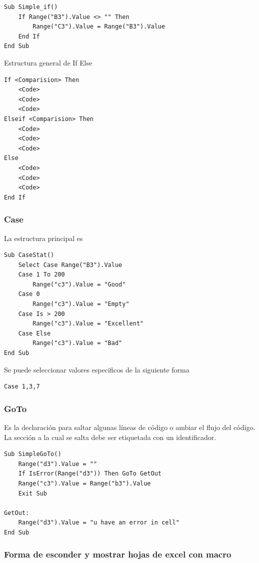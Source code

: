 \begin{verbatim}
Sub Simple_if()
    If Range("B3").Value <> "" Then 
        Range("C3").Value = Range("B3").Value
    End If
End Sub    
\end{verbatim}

Estructura general de If Else

\begin{verbatim}
If <Comparision> Then
    <Code>
    <Code>
    <Code>
Elseif <Comparision> Then
    <Code>
    <Code>
    <Code>
Else
    <Code>
    <Code>
    <Code>
End If
\end{verbatim}


\subsubsection{\textbf{Case}}

La estructura principal es

\begin{verbatim}
Sub CaseStat()
    Select Case Range("B3").Value
    Case 1 To 200
        Range("c3").Value = "Good"
    Case 0
        Range("c3").Value = "Empty"
    Case Is > 200
        Range("c3").Value = "Excellent"
    Case Else
        Range("c3").Value = "Bad"
End Sub
\end{verbatim}

Se puede seleccionar valores especificos de la siguiente forma

\begin{verbatim}
Case 1,3,7
\end{verbatim}

\subsubsection{\textbf{GoTo}}

Es la declaración para saltar algunas líneas de código o ambiar el flujo del código. La sección a la cual se salta debe ser etiquetada con un identificador.

\begin{verbatim}
Sub SimpleGoTo()
    Range("d3").Value = ""
    If IsError(Range("d3")) Then GoTo GetOut
    Range("c3").Value = Range("b3").Value
    Exit Sub
    
GetOut:
    Range("d3").Value = "u have an error in cell"
End Sub

\end{verbatim}

\subsubsection{Forma de esconder y mostrar hojas de excel con macro}


